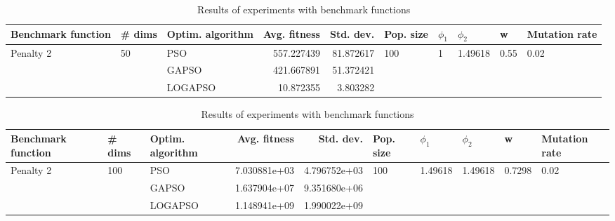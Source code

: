 \documentclass{article}
\begin{document}
\begin{table}
\centering
\caption{Results of experiments with benchmark functions}
\begin{tabular}{lllrrlllll}
\toprule
        Benchmark function &             \# dims & Optim. algorithm &  Avg. fitness &  Std. dev. &            Pop. size &         $\phi_{1}$ &               $\phi_{2}$ &                     w &         Mutation rate \\
\midrule
\multirow{3}{*}{Penalty 2} & \multirow{3}{*}{50} &              PSO &    557.227439 &  81.872617 & \multirow{3}{*}{100} & \multirow{3}{*}{1} & \multirow{3}{*}{1.49618} & \multirow{3}{*}{0.55} & \multirow{3}{*}{0.02} \\
                           &                     &            GAPSO &    421.667891 &  51.372421 &                      &                    &                          &                       &                       \\
                           &                     &          LOGAPSO &     10.872355 &   3.803282 &                      &                    &                          &                       &                       \\
\bottomrule
\end{tabular}
\end{table}
\begin{table}
\centering
\caption{Results of experiments with benchmark functions}
\begin{tabular}{lllrrlllll}
\toprule
        Benchmark function &              \# dims & Optim. algorithm &  Avg. fitness &    Std. dev. &            Pop. size &               $\phi_{1}$ &               $\phi_{2}$ &                       w &         Mutation rate \\
\midrule
\multirow{3}{*}{Penalty 2} & \multirow{3}{*}{100} &              PSO &  7.030881e+03 & 4.796752e+03 & \multirow{3}{*}{100} & \multirow{3}{*}{1.49618} & \multirow{3}{*}{1.49618} & \multirow{3}{*}{0.7298} & \multirow{3}{*}{0.02} \\
                           &                      &            GAPSO &  1.637904e+07 & 9.351680e+06 &                      &                          &                          &                         &                       \\
                           &                      &          LOGAPSO &  1.148941e+09 & 1.990022e+09 &                      &                          &                          &                         &                       \\
\bottomrule
\end{tabular}
\end{table}
\end{document}
